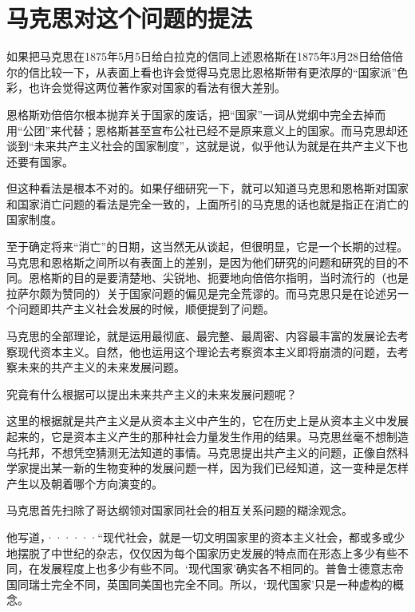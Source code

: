 \chapter{马克思对这个问题的提法} %

如果把马克思在1875年5月5日给白拉克的信同上述恩格斯在1875年3月28日给倍倍尔的信比较一下，从表面上看也许会觉得马克思比恩格斯带有更浓厚的“国家派”色彩，也许会觉得这两位著作家对国家的看法有很大差别。

恩格斯劝倍倍尔根本抛弃关于国家的废话，把“国家”一词从党纲中完全去掉而用“公团”来代替；恩格斯甚至宣布公社已经不是原来意义上的国家。而马克思却还谈到“未来共产主义社会的国家制度”，这就是说，似乎他认为就是在共产主义下也还要有国家。

但这种看法是根本不对的。如果仔细研究一下，就可以知道马克思和恩格斯对国家和国家消亡问题的看法是完全一致的，上面所引的马克思的话也就是指{\kaishu 正在消亡的}国家制度。

至于确定{\kaishu 将来}“消亡”的日期，这当然无从谈起，但很明显，它是一个长期的过程。马克思和恩格斯之间所以有表面上的差别，是因为他们研究的问题和研究的目的不同。恩格斯的目的是要清楚地、尖锐地、扼要地向倍倍尔指明，当时流行的（也是拉萨尔颇为赞同的）关于国家问题的偏见是完全荒谬的。而马克思只是在论述另一个问题即共产主义社会{\kaishu 发展}的时候，顺便提到了问题。

马克思的全部理论，就是运用最彻底、最完整、最周密、内容最丰富的发展论去考察现代资本主义。自然，他也运用这个理论去考察资本主义{\kaishu 即将}崩溃的问题，去考察{\kaishu 未来的}共产主义的{\kaishu 未来}发展问题。

究竟有什么{\kaishu 根据}可以提出未来共产主义的未来发展问题呢？

这里的根据就是共产主义是从资本主义中{\kaishu 产生}的，它在历史上是从资本主义中发展起来的，它是资本主义{\kaishu 产生}的那种社会力量发生作用的结果。马克思丝毫不想制造乌托邦，不想凭空猜测无法知道的事情。马克思提出共产主义的问题，正像自然科学家提出某一新的生物变种的发展问题一样，因为我们已经知道，这一变种是怎样产生以及朝着哪个方向演变的。

马克思首先扫除了哥达纲领对国家同社会的相互关系问题的糊涂观念。

\leftskip=10mm
\small

他写道，······“现代社会，就是一切文明国家里的资本主义社会，都或多或少地摆脱了中世纪的杂志，仅仅因为每个国家历史发展的特点而在形态上多少有些不同，在发展程度上也多少有些不同。‘现代国家’确实各不相同的。普鲁士德意志帝国同瑞士完全不同，英国同美国也完全不同。所以，‘现代国家’只是一种虚构的概念。

